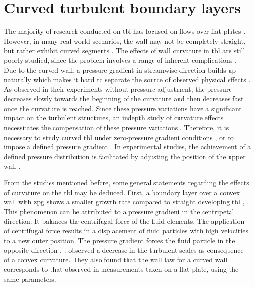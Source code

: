 \section{Curved turbulent boundary layers} \label{sec:curvedTheory}

The majority of research conducted on \acrshort{tbl} has focused on flows over flat plates \citep{pargal_adverse-pressure-gradient_2022}. 
However, in many real-world scenarios, the wall may not be completely straight, but rather exhibit curved segments \citep{spalart_direct_2024}. 
The effects of wall curvature in \acrshort{tbl} are still poorly studied, since the problem involves a range of inherent complications \citep{appelbaum_systematic_2025}. 
Due to the curved wall, a pressure gradient in streamwise direction builds up naturally which makes it hard to separate the source of observed physical effects \citep{so_experiment_1973}. 
As \citet{so_experiment_1973} observed in their experiments without pressure adjustment, the pressure decreases slowly towards the beginning of the curvature and then decreases fast once the curvature is reached. 
Since these pressure variations have a significant impact on the turbulent structures, an indepth study of curvature effects necessitates the compensation of these pressure variations \citep{appelbaum_systematic_2025}. 
Therefore, it is necessary to study curved \acrshort{tbl} under zero-pressure gradient conditions \citep{so_experiment_1973,gillis_turbulent_1983}, or to impose a defined pressure gradient \citep{schwarz_convex_1996,pargal_adverse-pressure-gradient_2022,spalart_direct_2024}. 
In experimental studies, the achievement of a defined pressure distribution is facilitated by adjusting the position of the upper wall \citep{so_experiment_1973, johnston_experimental_1981, gillis_turbulent_1983,schwarz_convex_1996}. 

From the studies mentioned before, some general statements regarding the effects of curvature on the \acrshort{tbl} may be deduced.
First, a boundary layer over a convex wall with \acrshort{zpg} shows a smaller growth rate compared to straight developing \acrshort{tbl} \citep{so_experiment_1973}, \citep{meroney_turbulent_1975}. 
This phenomenon can be attributed to a pressure gradient in the centripetal direction. 
It balances the centrifugal force of the fluid elements. 
The application of centrifugal force results in a displacement of fluid particles with high velocities to a new outer position. 
The pressure gradient forces the fluid particle in the opposite direction \citep{so_experiment_1973}, \citep{meroney_turbulent_1975}.
\citet{gillis_turbulent_1983} observed a decrease in the turbulent scales as consequence of a convex curvature. 
They also found that the wall law for a curved wall corresponds to that observed in measurements taken on a flat plate, using the same parameters. 

